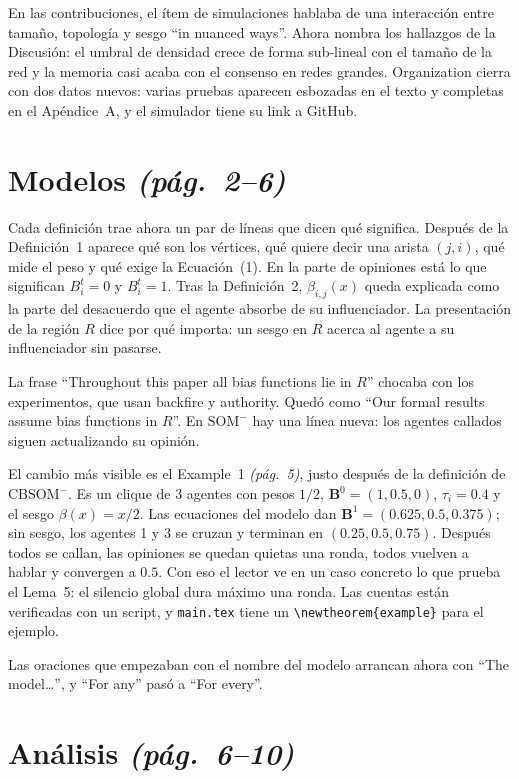 \documentclass[11pt,a4paper]{article}
\newcommand{\CBm}{$\mathrm{CBSOM}^{-}$}
\newcommand{\SOMm}{$\mathrm{SOM}^{-}$}
\newcommand{\pag}[1]{\textit{(pág.~#1)}}
\begin{document}
En las contribuciones, el ítem de simulaciones hablaba de una interacción entre
tamaño, topología y sesgo ``in nuanced ways''. Ahora nombra los hallazgos de la
Discusión: el umbral de densidad crece de forma sub-lineal con el tamaño de la
red y la memoria casi acaba con el consenso en redes grandes. Organization
cierra con dos datos nuevos: varias pruebas aparecen esbozadas en el texto y
completas en el Apéndice~A, y el simulador tiene su link a GitHub.

\section*{Modelos \pag{2--6}}

Cada definición trae ahora un par de líneas que dicen qué significa. Después de
la Definición~1 aparece qué son los vértices, qué quiere decir una arista
$(j,i)$, qué mide el peso y qué exige la Ecuación~(1). En la parte de opiniones
está lo que significan $B_i^t=0$ y $B_i^t=1$. Tras la Definición~2,
$\beta_{i,j}(x)$ queda explicada como la parte del desacuerdo que el agente
absorbe de su influenciador. La presentación de la región $R$ dice por qué
importa: un sesgo en $R$ acerca al agente a su influenciador sin pasarse.

La frase ``Throughout this paper all bias functions lie in $R$'' chocaba con los
experimentos, que usan backfire y authority. Quedó como ``Our formal results
assume bias functions in $R$''. En \SOMm{} hay una línea nueva: los agentes
callados siguen actualizando su opinión.

El cambio más visible es el Example~1 \pag{5}, justo después de la definición
de \CBm. Es un clique de 3 agentes con pesos $1/2$,
$\mathbf{B}^0=(1,0.5,0)$, $\tau_i=0.4$ y el sesgo $\beta(x)=x/2$. Las
ecuaciones del modelo dan $\mathbf{B}^1=(0.625,0.5,0.375)$; sin sesgo, los
agentes 1 y 3 se cruzan y terminan en $(0.25,0.5,0.75)$. Después todos se
callan, las opiniones se quedan quietas una ronda, todos vuelven a hablar y
convergen a $0.5$. Con eso el lector ve en un caso concreto lo que prueba el
Lema~5: el silencio global dura máximo una ronda. Las cuentas están verificadas
con un script, y \texttt{main.tex} tiene un \verb|\newtheorem{example}| para el
ejemplo.

Las oraciones que empezaban con el nombre del modelo arrancan ahora con ``The
model\ldots'', y ``For any'' pasó a ``For every''.

\section*{Análisis \pag{6--10}}
\end{document}
